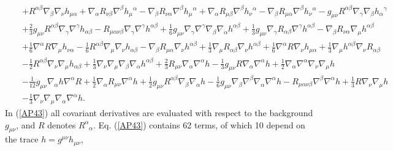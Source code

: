 \documentclass[aps]{revtex4}
\begin{document}
\begin{eqnarray}
\nonumber\\
&&+ R^{\alpha \beta} \nabla_{\beta}\nabla_{\nu}h_{\mu \alpha} 
+ \nabla_{\alpha}R_{\nu \beta} \nabla^{\beta}h_{\mu}{}^{\alpha} 
-  \nabla_{\beta}R_{\nu \alpha} \nabla^{\beta}h_{\mu}{}^{\alpha} + \nabla_{\alpha}R_{\mu \beta} \nabla^{\beta}h_{\nu}{}^{\alpha} -  \nabla_{\beta}R_{\mu \alpha} \nabla^{\beta}h_{\nu}{}^{\alpha} -  g_{\mu \nu} R^{\alpha \beta} \nabla_{\gamma}\nabla_{\beta}h_{\alpha}{}^{\gamma} 
\nonumber\\
&&+ \tfrac{2}{3} g_{\mu \nu} R^{\alpha \beta} \nabla_{\gamma}\nabla^{\gamma}h_{\alpha \beta} 
-  R_{\mu \alpha \nu \beta} \nabla_{\gamma}\nabla^{\gamma}h^{\alpha \beta} + \tfrac{1}{6} g_{\mu \nu} \nabla_{\gamma}\nabla^{\gamma}\nabla_{\beta}\nabla_{\alpha}h^{\alpha \beta} + \tfrac{1}{3} g_{\mu \nu} \nabla_{\gamma}R_{\alpha \beta} \nabla^{\gamma}h^{\alpha \beta} -  \nabla_{\beta}R_{\nu \alpha} \nabla_{\mu}h^{\alpha \beta} 
\nonumber\\
&&+ \tfrac{1}{6} \nabla^{\alpha}R \nabla_{\mu}h_{\nu \alpha} 
-  \tfrac{1}{6} R^{\alpha \beta} \nabla_{\mu}\nabla_{\nu}h_{\alpha \beta} -  \nabla_{\beta}R_{\mu \alpha} \nabla_{\nu}h^{\alpha \beta} + \tfrac{1}{3} \nabla_{\mu}R_{\alpha \beta} \nabla_{\nu}h^{\alpha \beta} + \tfrac{1}{6} \nabla^{\alpha}R \nabla_{\nu}h_{\mu \alpha} + \tfrac{1}{3} \nabla_{\mu}h^{\alpha \beta} \nabla_{\nu}R_{\alpha \beta} 
\nonumber\\
&&-  \tfrac{1}{2} R^{\alpha \beta} \nabla_{\nu}\nabla_{\mu}h_{\alpha \beta} 
+ \tfrac{1}{3} \nabla_{\nu}\nabla_{\mu}\nabla_{\beta}\nabla_{\alpha}h^{\alpha \beta}
	+\tfrac{2}{3} R_{\mu \nu} \nabla_{\alpha}\nabla^{\alpha}h -  \tfrac{1}{3} g_{\mu \nu} R \nabla_{\alpha}\nabla^{\alpha}h + \tfrac{1}{2} \nabla_{\alpha}\nabla^{\alpha}\nabla_{\nu}\nabla_{\mu}h 
\nonumber\\
&&-  \tfrac{1}{12} g_{\mu \nu} \nabla_{\alpha}h \nabla^{\alpha}R + \tfrac{1}{2} \nabla_{\alpha}R_{\mu \nu} \nabla^{\alpha}h 
	+ \tfrac{1}{2} g_{\mu \nu} R^{\alpha \beta} \nabla_{\beta}\nabla_{\alpha}h -  \tfrac{1}{6} g_{\mu \nu} \nabla_{\beta}\nabla^{\beta}\nabla_{\alpha}\nabla^{\alpha}h -  R_{\mu \alpha \nu \beta} \nabla^{\beta}\nabla^{\alpha}h + \tfrac{1}{3} R \nabla_{\nu}\nabla_{\mu}h 
\nonumber\\
&&-  \tfrac{1}{3} \nabla_{\nu}\nabla_{\mu}\nabla_{\alpha}\nabla^{\alpha}h.
\label{AP43}
\end{eqnarray}
%
In (\ref{AP43}) all covariant derivatives are evaluated with respect to the background $g_{\mu\nu}$, and $R$ denotes $R^{\alpha}_{\phantom{\alpha}\alpha}$.
Eq. (\ref{AP43}) contains 62 terms, of which 10 depend on the trace $h=g^{\mu\nu}h_{\mu\nu}$, 
\end{document}
